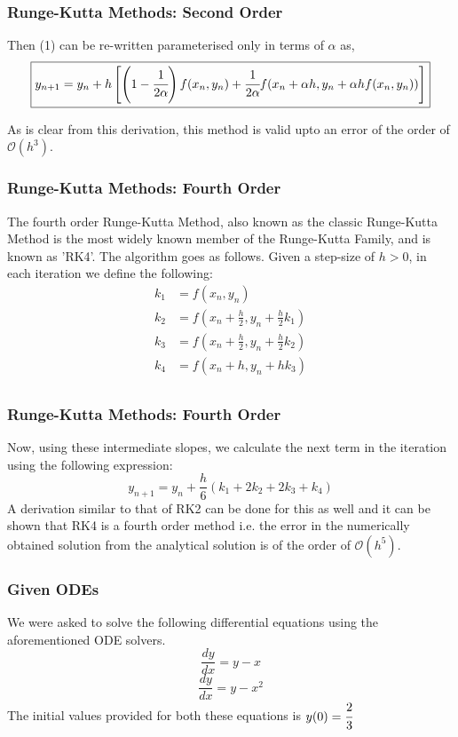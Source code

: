 \documentclass{beamer}
\newcommand{\bigO}{\mathcal{O}}
\begin{document}
\begin{frame}
    \frametitle{Runge-Kutta Methods: Second Order}
    Then (1) can be re-written parameterised only in terms of $\alpha$ as,
    $$\boxed{y_{n+1} = y_n + h\left[\left(1 - \cfrac{1}{2\alpha}\right)f(x_n, y_n) + \cfrac{1}{2\alpha}f(x_n + \alpha h, y_n + \alpha hf(x_n, y_n))\right]}$$

    As is clear from this derivation, this method is valid upto an error of the order of $\bigO(h^3)$.
\end{frame}
\begin{frame}
    \frametitle{Runge-Kutta Methods: Fourth Order}
    The fourth order Runge-Kutta Method, also known as the classic Runge-Kutta Method is the most widely known member of the Runge-Kutta Family, and is known as 'RK4'. The algorithm goes as follows. Given a step-size of $h > 0$, in each iteration we define the following:
    \begin{align*}
        k_1 &= f(x_n, y_n) \\    
        k_2 &= f\left(x_n + \frac{h}{2}, y_n + \frac{h}{2}k_1\right) \\
        k_3 &= f\left(x_n + \frac{h}{2}, y_n + \frac{h}{2}k_2\right) \\
        k_4 &= f\left(x_n + h, y_n + hk_3\right) \\
    \end{align*}
\end{frame}
\begin{frame}
    \frametitle{Runge-Kutta Methods: Fourth Order}
    Now, using these intermediate slopes, we calculate the next term in the iteration using the following expression:
    $$\boxed{y_{n + 1} = y_n + \frac{h}{6}(k_1 + 2k_2 + 2k_3 + k_4)}$$
A derivation similar to that of RK2 can be done for this as well and it can be shown that RK4 is a fourth order method i.e. the error in the numerically obtained solution from the analytical solution is of the order of $\mathcal{O}(h^5)$.
\end{frame}
\begin{frame}
    \frametitle{Given ODEs}
    We were asked to solve the following differential equations using the aforementioned ODE solvers.
    $$\frac{dy}{dx} = y - x$$
    $$\frac{dy}{dx} = y - x^2$$   
    The initial values provided for both these equations is $y(0) = \cfrac{2}{3}$
\end{frame}
\end{document}
